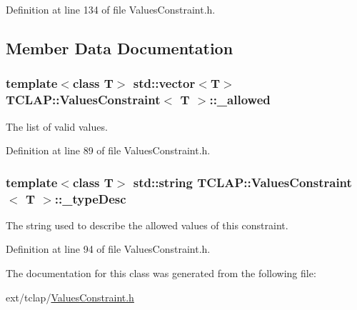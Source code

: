 Definition at line 134 of file Values\+Constraint.\+h.



\subsection{Member Data Documentation}
\hypertarget{class_t_c_l_a_p_1_1_values_constraint_ac43fa83688358c0ad06157053cce347a}{}
\subsubsection[{\+\_\+allowed}]{\setlength{\rightskip}{0pt plus 5cm}template$<$class T$>$ std\+::vector$<$T$>$ {\bf T\+C\+L\+A\+P\+::\+Values\+Constraint}$<$ T $>$\+::\+\_\+allowed\hspace{0.3cm}{\ttfamily [protected]}}\label{class_t_c_l_a_p_1_1_values_constraint_ac43fa83688358c0ad06157053cce347a}
The list of valid values. 

Definition at line 89 of file Values\+Constraint.\+h.

\hypertarget{class_t_c_l_a_p_1_1_values_constraint_a6ebc63fa5eea116a50aa5f76aee56fd6}{}
\subsubsection[{\+\_\+type\+Desc}]{\setlength{\rightskip}{0pt plus 5cm}template$<$class T$>$ std\+::string {\bf T\+C\+L\+A\+P\+::\+Values\+Constraint}$<$ T $>$\+::\+\_\+type\+Desc\hspace{0.3cm}{\ttfamily [protected]}}\label{class_t_c_l_a_p_1_1_values_constraint_a6ebc63fa5eea116a50aa5f76aee56fd6}
The string used to describe the allowed values of this constraint. 

Definition at line 94 of file Values\+Constraint.\+h.



The documentation for this class was generated from the following file\+:\begin{DoxyCompactItemize}
\item 
ext/tclap/\hyperlink{_values_constraint_8h}{Values\+Constraint.\+h}\end{DoxyCompactItemize}
